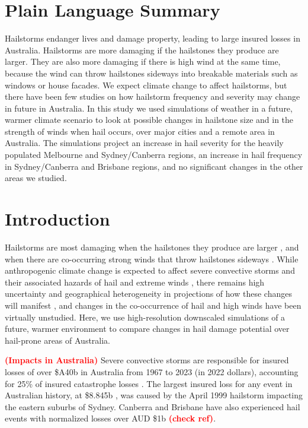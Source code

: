 \documentclass[]{agujournal2019}\usepackage[]{graphicx}\usepackage[]{xcolor}
\newcommand*{\todo}[1]{\textbf{\textcolor{red}{(#1)}}}
\begin{document}
\section*{Plain Language Summary}

Hailstorms endanger lives and damage property, leading to large insured losses in Australia. Hailstorms are more damaging if the hailstones they produce are larger. They are also more damaging if there is high wind at the same time, because the wind can throw hailstones sideways into breakable materials such as windows or house facades. We expect climate change to affect hailstorms, but there have been few studies on how hailstorm frequency and severity may change in future in Australia. In this study we used simulations of weather in a future, warmer climate scenario to look at possible changes in hailstone size and in the strength of winds when hail occurs, over major cities and a remote area in Australia. The simulations project an increase in hail severity for the heavily populated Melbourne and Sydney/Canberra regions, an increase in hail frequency in Sydney/Canberra and Brisbane regions, and no significant changes in the other areas we studied.

\section{Introduction}

Hailstorms are most damaging when the hailstones they produce are larger \cite{Brimelow_WF_2002, Eccel_IJC_2012}, and when there are co-occurring strong winds that throw hailstones sideways \cite{Changnon_JAMC_1967, Towery_JAMC_1976}. While anthropogenic climate change is expected to affect severe convective storms \cite{Allen_2018} and their associated hazards of hail \cite{Raupach_NREE_2021} and extreme winds \cite{Brown_JGRA_2021}, there remains high uncertainty and geographical heterogeneity in projections of how these changes will manifest \cite{Raupach_NREE_2021, Brown_JGRA_2021}, and changes in the co-occurrence of hail and high winds have been virtually unstudied. Here, we use high-resolution downscaled simulations of a future, warmer environment to compare changes in hail damage potential over hail-prone areas of Australia.

\todo{Impacts in Australia} Severe convective storms are responsible for insured losses of over \$A40b in Australia from 1967 to 2023 (in 2022 dollars), accounting for 25\% of insured catastrophe losses \cite{ICA_2024}. The largest insured loss for any event in Australian history, at \$8.845b \cite<normalized to 2022 dollars, >{ICA_2024}, was caused by the April 1999 hailstorm impacting the eastern suburbs of Sydney. Canberra and Brisbane have also experienced hail events with normalized losses over AUD \$1b \cite{ICA_2024} \todo{check ref}. 
\end{document}
